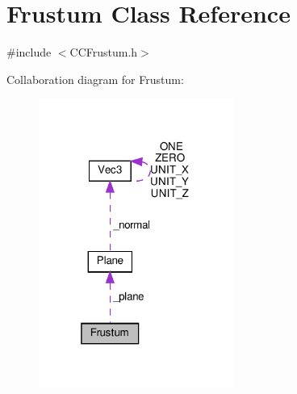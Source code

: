\hypertarget{classFrustum}{}\section{Frustum Class Reference}
\label{classFrustum}


{\ttfamily \#include $<$C\+C\+Frustum.\+h$>$}



Collaboration diagram for Frustum\+:
\nopagebreak
\begin{figure}[H]
\begin{center}
\leavevmode
\includegraphics[width=181pt]{classFrustum__coll__graph}
\end{center}
\end{figure}
